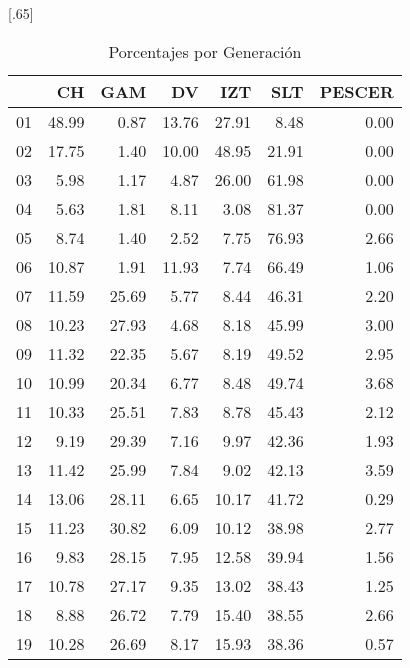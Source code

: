 \documentclass[12pt]{article}
\begin{document}
\begin{table}[ht]
\centering
\caption{\small{Porcentajes por Generación}}
\scalebox{0.65}[.65]{
\begin{tabular}{r|rrrrrr}
  \hline
 & CH & GAM & DV & IZT & SLT & PESCER \\ 
  \hline
01 & 48.99 & 0.87 & 13.76 & 27.91 & 8.48 & 0.00 \\ 
  02 & 17.75 & 1.40 & 10.00 & 48.95 & 21.91 & 0.00 \\ 
  03 & 5.98 & 1.17 & 4.87 & 26.00 & 61.98 & 0.00 \\ 
  04 & 5.63 & 1.81 & 8.11 & 3.08 & 81.37 & 0.00 \\ 
  05 & 8.74 & 1.40 & 2.52 & 7.75 & 76.93 & 2.66 \\ 
  06 & 10.87 & 1.91 & 11.93 & 7.74 & 66.49 & 1.06 \\ 
  07 & 11.59 & 25.69 & 5.77 & 8.44 & 46.31 & 2.20 \\ 
  08 & 10.23 & 27.93 & 4.68 & 8.18 & 45.99 & 3.00 \\ 
  09 & 11.32 & 22.35 & 5.67 & 8.19 & 49.52 & 2.95 \\ 
  10 & 10.99 & 20.34 & 6.77 & 8.48 & 49.74 & 3.68 \\ 
  11 & 10.33 & 25.51 & 7.83 & 8.78 & 45.43 & 2.12 \\ 
  12 & 9.19 & 29.39 & 7.16 & 9.97 & 42.36 & 1.93 \\ 
  13 & 11.42 & 25.99 & 7.84 & 9.02 & 42.13 & 3.59 \\ 
  14 & 13.06 & 28.11 & 6.65 & 10.17 & 41.72 & 0.29 \\ 
  15 & 11.23 & 30.82 & 6.09 & 10.12 & 38.98 & 2.77 \\ 
  16 & 9.83 & 28.15 & 7.95 & 12.58 & 39.94 & 1.56 \\ 
  17 & 10.78 & 27.17 & 9.35 & 13.02 & 38.43 & 1.25 \\ 
  18 & 8.88 & 26.72 & 7.79 & 15.40 & 38.55 & 2.66 \\ 
  19 & 10.28 & 26.69 & 8.17 & 15.93 & 38.36 & 0.57 \\ 
   \hline
\end{tabular}}
\end{table}
\end{document}
